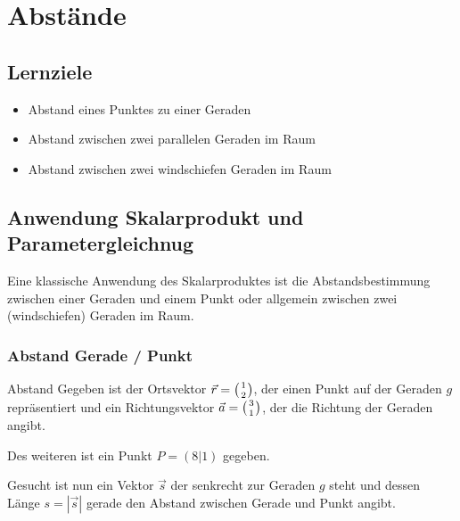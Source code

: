\section{Abstände}

\subsection*{Lernziele}
\begin{itemize}
  \item Abstand eines Punktes zu einer Geraden
\item Abstand zwischen zwei parallelen Geraden im Raum
\item Abstand zwischen zwei windschiefen Geraden im Raum
\end{itemize}

\newpage

\subsection{Anwendung Skalarprodukt und Parametergleichnug}

Eine klassische Anwendung des Skalarproduktes ist die
Abstandsbestimmung zwischen einer Geraden und einem Punkt oder
allgemein zwischen zwei (windschiefen) Geraden im Raum.
\newpage

\subsubsection{Abstand Gerade / Punkt}

\begin{beispiel}{Abstand}{}
Gegeben ist der Ortsvektor $\vec{r}=\left(1 \atop 2\right)$, der einen Punkt auf der
Geraden $g$ repräsentiert und ein Richtungsvektor
$\vec{a}=\left(3\atop 1\right)$, der
die Richtung der Geraden angibt.

Des weiteren ist ein Punkt $P=(8|1)$ gegeben.

Gesucht ist nun ein Vektor
$\vec{s}$ der senkrecht zur Geraden $g$ steht und dessen Länge
$s=|\vec{s}|$ gerade den Abstand zwischen Gerade und Punkt angibt.
\end{beispiel}


